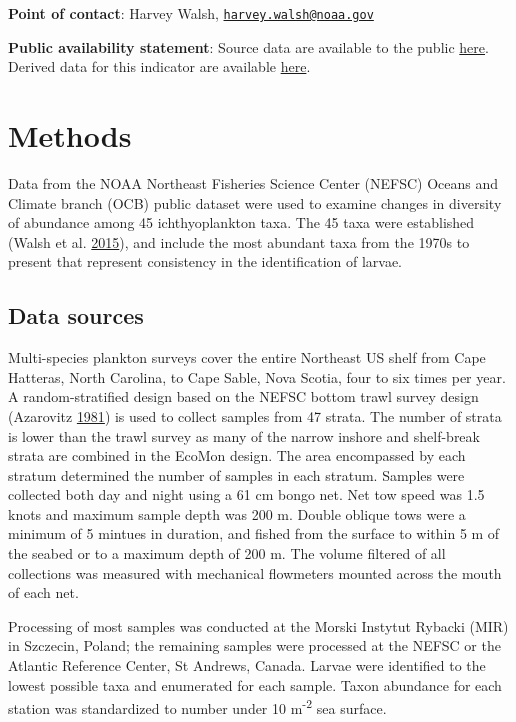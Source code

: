 \documentclass[
]{book}
\begin{document}
\textbf{Point of contact}: Harvey Walsh, \href{mailto:harvey.walsh@noaa.gov}{\nolinkurl{harvey.walsh@noaa.gov}}

\textbf{Public availability statement}: Source data are available to the public \href{ftp://ftp.nefsc.noaa.gov/pub/hydro/zooplankton_data/}{here}. Derived data for this indicator are available \href{https://comet.nefsc.noaa.gov/erddap/tabledap/ichthyo_div_soe_v1.html}{here}.

\hypertarget{methods-20}{%
\section{Methods}\label{methods-20}}

Data from the NOAA Northeast Fisheries Science Center (NEFSC) Oceans and Climate branch (OCB) public dataset were used to examine changes in diversity of abundance among 45 ichthyoplankton taxa. The 45 taxa were established (Walsh et al. \protect\hyperlink{ref-RN126}{2015}), and include the most abundant taxa from the 1970s to present that represent consistency in the identification of larvae.

\hypertarget{data-sources-20}{%
\subsection{Data sources}\label{data-sources-20}}

Multi-species plankton surveys cover the entire Northeast US shelf from Cape Hatteras, North Carolina, to Cape Sable, Nova Scotia, four to six times per year. A random-stratified design based on the NEFSC bottom trawl survey design (Azarovitz \protect\hyperlink{ref-Azarovitz1981}{1981}) is used to collect samples from 47 strata. The number of strata is lower than the trawl survey as many of the narrow inshore and shelf-break strata are combined in the EcoMon design.
The area encompassed by each stratum determined the number of samples in each stratum. Samples were collected both day and night using a 61 cm bongo net. Net tow speed was 1.5 knots and maximum sample depth was 200 m. Double oblique tows were a minimum of 5 mintues in duration, and fished from the surface to within 5 m of the seabed or to a maximum depth of 200 m. The volume filtered of all collections was measured with mechanical flowmeters mounted across the mouth of each net.

Processing of most samples was conducted at the Morski Instytut Rybacki (MIR) in Szczecin, Poland; the remaining samples were processed at the NEFSC or the Atlantic Reference Center, St Andrews, Canada. Larvae were identified to the lowest possible taxa and enumerated for each sample. Taxon abundance for each station was standardized to number under 10 m\textsuperscript{-2} sea surface.
\end{document}

